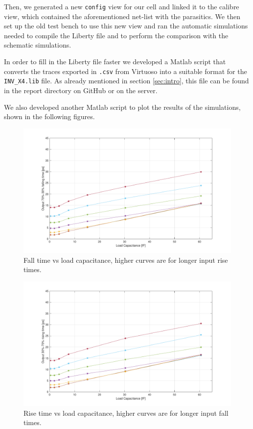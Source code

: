 \documentclass[a4paper]{article}
\begin{document}
Then, we generated a new \texttt{config} view for our cell and linked it to the calibre view, which contained the aforementioned net-list with the parasitics. We then set up the old test bench to use this new view and ran the automatic simulations needed to compile the Liberty file and to perform the comparison with the schematic simulations.

In order to fill in the Liberty file faster we developed a Matlab script that converts the traces exported in \texttt{.csv} from Virtuoso into a suitable format for the \texttt{INV\_X4.lib} file. As already mentioned in section \ref{sec:intro}, this file can be found in the report directory on GitHub or on the server.

We also developed another Matlab script to plot the results of the simulations, shown in the following figures.
\begin{figure}[H]
	\centering
	\includegraphics[width=\linewidth]{../INV_X4/simulations/t_F.pdf}
	\caption{Fall time vs load capacitance, higher curves are for longer input rise times.}
	\label{fig:inv_t_F}
\end{figure}
\begin{figure}[H]
	\centering
	\includegraphics[width=\linewidth]{../INV_X4/simulations/t_R.pdf}
	\caption{Rise time vs load capacitance, higher curves are for longer input fall times.}
	\label{fig:inv_t_R}
\end{figure}
\end{document}
